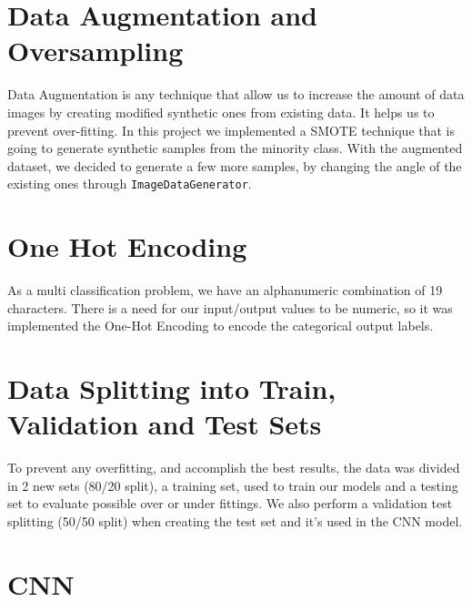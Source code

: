 \documentclass[conference]{IEEEtran}
\begin{document}
\section{Data Augmentation and Oversampling}
Data Augmentation is any technique that allow us to increase the amount of data images by creating modified synthetic ones from existing data. It helps us to prevent over-fitting. In this project we implemented a SMOTE technique that is going to generate synthetic samples from the minority class. With the augmented dataset, we decided to generate a few more samples, by changing the angle of the existing ones through \texttt{ImageDataGenerator}. 

\section{One Hot Encoding}
As a multi classification problem, we have an alphanumeric combination of 19 characters. There is a need for our input/output values to be numeric, so it was implemented the One-Hot Encoding to encode the categorical output labels.

\section{Data Splitting into Train, Validation and Test Sets}

To prevent any overfitting, and accomplish the best results, the data was divided in 2 new sets (80/20 split), a training set, used to train our models and a testing set to evaluate possible over or under fittings. We also perform a validation test splitting (50/50 split) when creating the test set and it's used in the CNN model.

\section{CNN}
\end{document}
